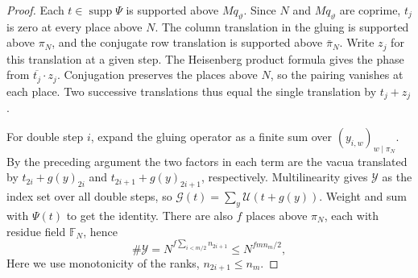 \begin{proof}
Each $t\in\operatorname{supp}\Psi$ is supported above $Mq_\vartheta$. Since $N$ and $Mq_\vartheta$ are coprime, $t_j$ is zero at every place above $N$. The column translation in the gluing is supported above $\pi_N$, and the conjugate row translation is supported above $\bar\pi_N$. Write $z_j$ for this translation at a given step. The Heisenberg product formula gives the phase from $\overline{t_j}\cdot z_j$. Conjugation preserves the places above $N$, so the pairing vanishes at each place. Two successive translations thus equal the single translation by $t_j+z_j$.

For double step $i$, expand the gluing operator as a finite sum over $(y_{i,w})_{w\mid\pi_N}$. By the preceding argument the two factors in each term are the vacua translated by $t_{2i}+g(y)_{2i}$ and $t_{2i+1}+g(y)_{2i+1}$, respectively. Multilinearity gives $\mathcal Y$ as the index set over all double steps, so $\mathcal G(t)=\sum_y\mathcal U(t+g(y))$. Weight and sum with $\Psi(t)$ to get the identity. There are also $f$ places above $\pi_N$, each with residue field $\mathbb F_N$, hence
\[
 \#\mathcal Y=N^{f\sum_{i<m/2}n_{2i+1}}
       \le N^{fmn_m/2},
\]
Here we use monotonicity of the ranks, $n_{2i+1}\le n_m$.
\end{proof}

